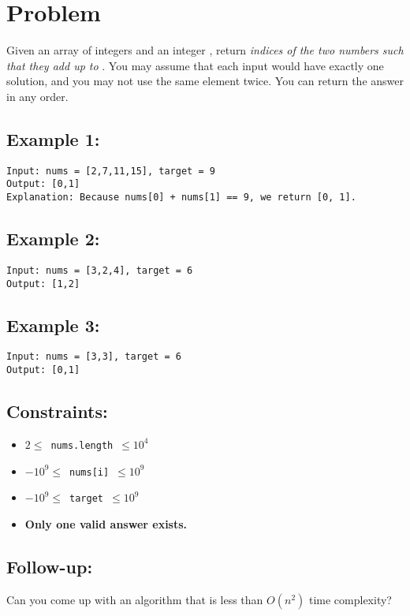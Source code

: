 
\section*{Problem}

Given an array of integers  and an integer , return \textit{indices of the two numbers such that they add up to} . You may assume that each input would have exactly one solution, and you may not use the same element twice. You can return the answer in any order.

\subsection*{Example 1:}

\begin{lstlisting}
Input: nums = [2,7,11,15], target = 9
Output: [0,1]
Explanation: Because nums[0] + nums[1] == 9, we return [0, 1].
\end{lstlisting}


\subsection*{Example 2:}

\begin{lstlisting}
Input: nums = [3,2,4], target = 6
Output: [1,2]
\end{lstlisting}


\subsection*{Example 3:}

\begin{lstlisting}
Input: nums = [3,3], target = 6
Output: [0,1]
\end{lstlisting}


\subsection*{Constraints:}

\begin{itemize}
  \item{$2 \le \,$ \texttt{nums.length} $\, \le 10^4$}
  \item{$-10^9 \le \,$ \texttt{nums[i]} $\, \le 10^9$}
  \item{$-10^9 \le \,$ \texttt{target} $\, \le 10^9$}
  \item{\textbf{Only one valid answer exists.}}
\end{itemize}


\subsection*{Follow-up:}

Can you come up with an algorithm that is less than $O(n^2)$ time complexity?


\clearpage
